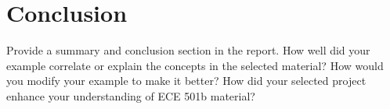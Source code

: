 \documentclass[conference]{IEEEtran}
\begin{document}
    \section{Conclusion}
    
    Provide a summary and conclusion section in the report. How well did your example correlate or explain the concepts in the selected material? How would you modify your example to make it better? How did your selected project enhance your understanding of ECE 501b material?

    \nocite{jaradet_svd_image_compression}
    \nocite{shlens_2014_tutorial}
    \nocite{omar_image_compression}
    \nocite{xu_color_conversion}
    \newpage
    {}
    
\end{document}
